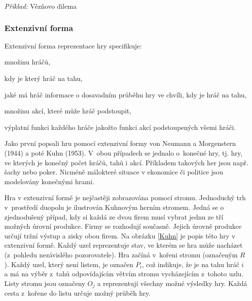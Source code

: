 \documentclass[a5paper,12pt]{article}
\begin{document}
    \emph{Příklad:} Vězňovo dilema

    \subsubsection{Extenzivní forma}
    Extenzivní forma reprezentace hry specifikuje:
    \begin{compactitem}
    \item množinu hráčů,
    \item kdy je který hráč na tahu,
    \item jaké má hráč informace o dosavadním průběhu hry ve chvíli, kdy je hráč na tahu,
    \item množinu akcí, které může hráč podstoupit,
    \item výplatní funkci každého hráče jakožto funkci akcí podstoupených všemi hráči. 
    \end{compactitem}

    Jako první popsali hru pomocí extenzivní formy von Neumann a Morgenstern (1944) a poté Kuhn (1953). V~obou případech se jednalo o~konečné hry, tj. hry, ve kterých je konečný počet hráčů, tahů i akcí. Příkladem takových her jsou např. šachy nebo poker. Nicméně málokteré situace v ekonomice či politice jsou modelovány konečnými hrami. 

    Hra v extenzivní formě je nejčastěji zobrazována pomocí stromu. Jednoduchý trh v~prostředí duopolu je ilustrován Kuhnovým herním stromem. Jedná se o zjednodušený případ, kdy si každá ze dvou firem musí vybrat jednu ze tří možných úrovní produkce. Firmy se rozhodují současně. Jejich úrovně produkce určují tržní výstup a zisky obou firem. Na obrázku \ref{Kuhn} je popis této hry v extenzivní formě. Každý uzel reprezentuje stav, ve kterém se hra může nacházet (z~pohledu nezávislého pozorovatele). Hra začíná v~kořeni stromu (označeným $R$). Každý uzel, který není listem, je označen $P_i$, což indikuje, že je na tahu hráč $i$ a má na výběr z~tahů odpovídajícím větvím stromu vycházejícím z~tohoto uzlu. Listy stromu jsou označeny $O_j$ a reprezentují všechny možné výsledky hry. Každá cesta z~kořene do listu určuje možný průběh hry.
\end{document}
